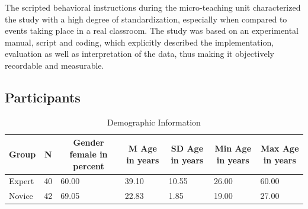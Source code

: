 \documentclass[
  man]{apa6}
\begin{document}
The scripted behavioral instructions during the micro-teaching unit characterized the study with a high degree of standardization, especially when compared to events taking place in a real classroom. The study was based on an experimental manual, script and coding, which explicitly described the implementation, evaluation as well as interpretation of the data, thus making it objectively recordable and measurable.

\subsection{Participants}\label{participants}

\begin{table}[h]

\begin{center}
\begin{threeparttable}

\caption{\label{tab:demographicstable}Demographic Information}

\tiny{

\begin{tabular}{lllllll}
\toprule
Group & \multicolumn{1}{c}{N} & \multicolumn{1}{c}{Gender female in percent} & \multicolumn{1}{c}{M Age in years} & \multicolumn{1}{c}{SD Age in years} & \multicolumn{1}{c}{Min Age in years} & \multicolumn{1}{c}{Max Age in years}\\
\midrule
Expert & 40 & 60.00 & 39.10 & 10.55 & 26.00 & 60.00\\
Novice & 42 & 69.05 & 22.83 & 1.85 & 19.00 & 27.00\\
\bottomrule
\end{tabular}

}

\end{threeparttable}
\end{center}

\end{table}
\end{document}
